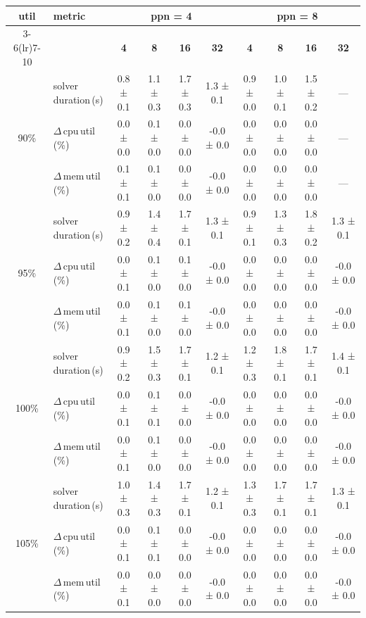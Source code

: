 \begin{tabular}{@{}c l *{8}{c}@{}}
\toprule
\multirow{2}{*}{\textbf{util}} & \multirow{2}{*}{\textbf{metric}} &\multicolumn{4}{c}{\textbf{ppn = 4}} & \multicolumn{4}{c}{\textbf{ppn = 8}}\\
\cmidrule(lr){3-6}\cmidrule(lr){7-10}
 &  & \textbf{4} & \textbf{8} & \textbf{16} & \textbf{32} & \textbf{4} & \textbf{8} & \textbf{16} & \textbf{32}\\
\midrule
\multirow{3}{*}{90\%}
& solver\,duration\,(s) & 0.8 ± 0.1 & 1.1 ± 0.3 & 1.7 ± 0.3 & 1.3 ± 0.1 & 0.9 ± 0.0 & 1.0 ± 0.1 & 1.5 ± 0.2 & \multicolumn{1}{c}{—} \\
& $\Delta$\,cpu\,util\,(\%) & 0.0 ± 0.0 & 0.1 ± 0.0 & 0.0 ± 0.0 & -0.0 ± 0.0 & 0.0 ± 0.0 & 0.0 ± 0.0 & 0.0 ± 0.0 & \multicolumn{1}{c}{—} \\
& $\Delta$\,mem\,util\,(\%) & 0.1 ± 0.1 & 0.1 ± 0.0 & 0.0 ± 0.0 & -0.0 ± 0.0 & 0.0 ± 0.0 & 0.0 ± 0.0 & 0.0 ± 0.0 & \multicolumn{1}{c}{—} \\
\midrule
\multirow{3}{*}{95\%}
& solver\,duration\,(s) & 0.9 ± 0.2 & 1.4 ± 0.4 & 1.7 ± 0.1 & 1.3 ± 0.1 & 0.9 ± 0.1 & 1.3 ± 0.3 & 1.8 ± 0.2 & 1.3 ± 0.1 \\
& $\Delta$\,cpu\,util\,(\%) & 0.0 ± 0.1 & 0.1 ± 0.0 & 0.1 ± 0.0 & -0.0 ± 0.0 & 0.0 ± 0.0 & 0.0 ± 0.0 & 0.0 ± 0.0 & -0.0 ± 0.0 \\
& $\Delta$\,mem\,util\,(\%) & 0.0 ± 0.1 & 0.1 ± 0.0 & 0.1 ± 0.0 & -0.0 ± 0.0 & 0.0 ± 0.0 & 0.0 ± 0.0 & 0.0 ± 0.0 & -0.0 ± 0.0 \\
\midrule
\multirow{3}{*}{100\%}
& solver\,duration\,(s) & 0.9 ± 0.2 & 1.5 ± 0.3 & 1.7 ± 0.1 & 1.2 ± 0.1 & 1.2 ± 0.3 & 1.8 ± 0.1 & 1.7 ± 0.1 & 1.4 ± 0.1 \\
& $\Delta$\,cpu\,util\,(\%) & 0.0 ± 0.1 & 0.1 ± 0.1 & 0.0 ± 0.0 & -0.0 ± 0.0 & 0.0 ± 0.0 & 0.0 ± 0.0 & 0.0 ± 0.0 & -0.0 ± 0.0 \\
& $\Delta$\,mem\,util\,(\%) & 0.0 ± 0.1 & 0.1 ± 0.0 & 0.0 ± 0.0 & -0.0 ± 0.0 & 0.0 ± 0.0 & 0.0 ± 0.0 & 0.0 ± 0.0 & -0.0 ± 0.0 \\
\midrule
\multirow{3}{*}{105\%}
& solver\,duration\,(s) & 1.0 ± 0.3 & 1.4 ± 0.3 & 1.7 ± 0.1 & 1.2 ± 0.1 & 1.3 ± 0.3 & 1.7 ± 0.1 & 1.7 ± 0.1 & 1.3 ± 0.1 \\
& $\Delta$\,cpu\,util\,(\%) & 0.0 ± 0.1 & 0.1 ± 0.1 & 0.0 ± 0.0 & -0.0 ± 0.0 & 0.0 ± 0.0 & 0.0 ± 0.0 & 0.0 ± 0.0 & -0.0 ± 0.0 \\
& $\Delta$\,mem\,util\,(\%) & 0.0 ± 0.1 & 0.0 ± 0.0 & 0.0 ± 0.0 & -0.0 ± 0.0 & 0.0 ± 0.0 & 0.0 ± 0.0 & 0.0 ± 0.0 & -0.0 ± 0.0 \\
\bottomrule
\end{tabular}
